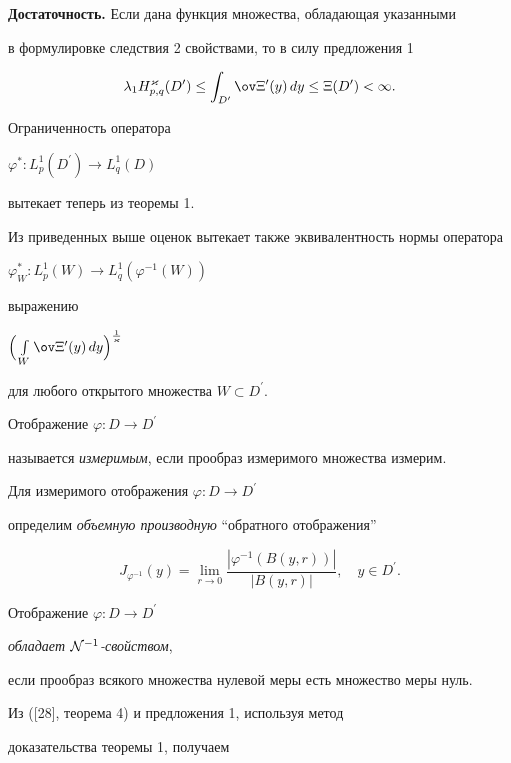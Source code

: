 \begin{pf}
\medskip





{\bf Достаточность.} Если дана функция множества, обладающая указанными


в формулировке следствия 2 свойствами, то в силу предложения 1


$$


\lambda_1H^\varkappa_{p,q}(D^{\prime})\leq


\int_{D^{\prime}}\ov\Xi{}^{\prime}(y)\,dy


\leq\Xi(D^{\prime})<\infty.


$$


Ограниченность оператора


$\varphi^{*} :L_{p}^{1}(D^{\prime})\to L_{q}^{1}(D)$


вытекает теперь из теоремы 1.


Из приведенных выше оценок вытекает также эквивалентность нормы оператора


$\varphi_W^*:L^1_p(W)\to L^1_q(\varphi^{-1}(W))$


выражению


$\Big(\int\limits_W\ov\Xi{}^{\prime}(y)\,dy\Big)^{\frac{1}{\varkappa}}$


для любого открытого множества $W\subset D^{\prime}$.


\end{pf}





Отображение $\varphi : D\to D^{\prime}$


называется {\it измеримым}, если прообраз измеримого множества измерим.





Для измеримого отображения $\varphi : D\to D^{\prime}$


определим {\it объемную производную} ``обратного отображения''


$$


J_{\varphi^{-1}}(y) = \lim_{r\to 0}


\frac{|\varphi^{-1}(B(y,r))|}{|B(y,r)|},\quad y\in D^{\prime}.


$$


Отображение $\varphi : D\to D^{\prime}$


{\it обладает ${\cal N}^{-1}$-свойством},


если прообраз всякого множества нулевой меры есть множество меры нуль.





Из ([28], теорема 4) и предложения 1, используя метод


доказательства теоремы 1, получаем 

























